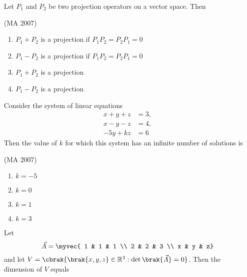 \item Let $P_1$ and $P_2$ be two projection operators on a vector space. 
Then 

\hfill{(MA 2007)}
\begin{enumerate}    
    \item $P_1 + P_2$ is a projection if $P_1 P_2 = P_2 P_1 = 0$
    \item $P_1 - P_2$ is a projection if $P_1 P_2 = P_2 P_1 = 0$
    \item $P_1 + P_2$ is a projection
    \item $P_1 - P_2$ is a projection
\end{enumerate}
\item Consider the system of linear equations         
\begin{align*}
x + y + z &= 3 ,\\ 
x - y - z &= 4 , \\
-5y + kz &= 6
\end{align*}
Then the value of $k$ for which this system has an infinite number of solutions is

\hfill{(MA 2007)}
\begin{multicols}{4}
\begin{enumerate}    
    \item $k = -5$
    \item $k = 0$
    \item $k = 1$
    \item $k = 3$
\end{enumerate}
\end{multicols}
%
\item Let     
$$\vec{A} = \myvec{
1 & 1 & 1 \\
2 & 2 & 3 \\
x & y & z}$$
and let $V = \cbrak{\brak{x, y, z} \in \mathbb{R}^3 : \det\brak{\vec{A}} = 0}$. Then the dimension of $V$ equals

